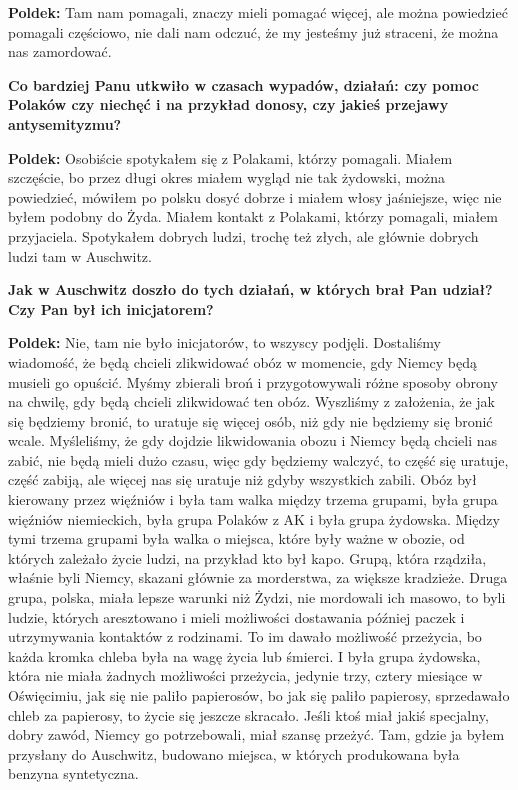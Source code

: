 \begin{otherlanguage}{polish}
\textbf{Poldek:} Tam nam pomagali, znaczy mieli pomagać więcej, ale można powiedzieć pomagali częściowo, nie dali nam odczuć, że my jesteśmy już straceni, że można nas zamordować.

\textbf{Co bardziej Panu utkwiło w czasach wypadów, działań: czy pomoc Polaków czy niechęć i na przykład donosy, czy jakieś przejawy antysemityzmu?}

\textbf{Poldek:} Osobiście spotykałem się z Polakami, którzy pomagali. Miałem szczęście, bo przez długi okres miałem wygląd nie tak żydowski, można powiedzieć, mówiłem po polsku dosyć dobrze i miałem włosy jaśniejsze, więc nie byłem podobny do Żyda. Miałem kontakt z Polakami, którzy pomagali, miałem przyjaciela. Spotykałem dobrych ludzi, trochę też złych, ale głównie dobrych ludzi tam w Auschwitz.
 
\textbf{Jak w Auschwitz doszło do tych działań, w których brał Pan udział? Czy Pan był ich inicjatorem?}
  
\textbf{Poldek:} Nie, tam nie było inicjatorów, to wszyscy podjęli. Dostaliśmy wiadomość, że będą chcieli zlikwidować obóz w momencie, gdy Niemcy będą musieli go opuścić. Myśmy zbierali broń i przygotowywali różne sposoby obrony na chwilę, gdy będą chcieli zlikwidować ten obóz. Wyszliśmy z założenia, że jak się będziemy bronić, to uratuje się więcej osób, niż gdy nie będziemy się bronić wcale. Myśleliśmy, że gdy dojdzie likwidowania obozu i Niemcy będą chcieli nas zabić, nie będą mieli dużo czasu, więc gdy będziemy walczyć, to część się uratuje, część zabiją, ale więcej nas się uratuje niż gdyby wszystkich zabili. Obóz był kierowany przez więźniów i była tam walka między trzema grupami, była grupa więźniów niemieckich, była grupa Polaków z AK i była grupa żydowska. Między tymi trzema grupami była walka o miejsca, które były ważne w obozie, od których zależało życie ludzi, na przykład kto był kapo. Grupą, która rządziła, właśnie byli Niemcy, skazani głównie za morderstwa, za większe kradzieże. Druga grupa, polska, miała lepsze warunki niż Żydzi, nie mordowali ich masowo, to byli ludzie, których aresztowano i mieli możliwości dostawania później paczek i utrzymywania kontaktów z rodzinami. To im dawało możliwość przeżycia, bo każda kromka chleba była na wagę życia lub śmierci. I była grupa żydowska, która nie miała żadnych możliwości przeżycia, jedynie trzy, cztery miesiące w Oświęcimiu, jak się nie paliło papierosów, bo jak się paliło papierosy, sprzedawało chleb za papierosy, to życie się jeszcze skracało. Jeśli ktoś miał jakiś specjalny, dobry zawód, Niemcy go potrzebowali, miał szansę przeżyć. Tam, gdzie ja byłem przysłany do Auschwitz, budowano miejsca, w których produkowana była benzyna syntetyczna. 
 

\end{otherlanguage}

